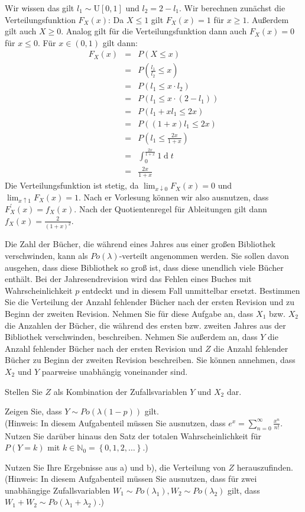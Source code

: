 \begin{Answer}
Wir wissen das gilt $l_1\sim \text{U}\left[0,1\right]$ und $l_2=2-l_1$. Wir berechnen zunächst die Verteilungsfunktion $F_X(x)$:
Da $X\leq 1$ gilt $F_X(x)=1$ für $x\geq1$. Außerdem gilt auch $X\geq 0$. Analog gilt für die Verteilungsfunktion dann auch $F_X(x)=0$ für $x\leq0$. Für $x\in\left(0,1\right)$ gilt dann:
\begin{eqnarray*}
	F_X(x)&=&P(X\leq x)\\
	&=&P(\frac{l_1}{l_2}\leq x)\\
	&=&P(l_1\leq x\cdot l_2)\\
	&=&P(l_1\leq x\cdot (2-l_1))\\
	&=&P(l_1+xl_1\leq 2x)\\
	&=&P((1+x)l_1\leq 2x)\\
	&=&P(l_1\leq \frac{2x}{1+x})\\
	&=&\int_0^{\frac{2x}{1+x}}1\operatorname{d}t\\
	&=&\frac{2x}{1+x}
\end{eqnarray*}
Die Verteilungsfunktion ist stetig, da $\lim_{x\downarrow0}F_X(x)=0$ und $\lim_{x\uparrow1}F_X(x)=1$. Nach er Vorlesung können wir also ausnutzen, dass $F^{'}_X(x)=f_X(x)$. Nach der Quotientenregel für Ableitungen gilt dann $f_X(x)=\frac{2}{(1+x)^2}$.
\end{Answer}


\begin{Exercise}
	Die Zahl der Bücher, die während eines Jahres aus einer großen Bibliothek verschwinden, kann als $Po(\lambda)$-verteilt angenommen werden. Sie sollen davon ausgehen, dass diese Bibliothek so groß ist, dass diese unendlich viele Bücher enthält. Bei der Jahresendrevision wird das Fehlen eines Buches mit Wahrscheinlichkeit $p$ entdeckt und in diesem Fall unmittelbar ersetzt. Bestimmen Sie die Verteilung der Anzahl fehlender Bücher nach der ersten Revision und zu Beginn der zweiten Revision. Nehmen Sie für diese Aufgabe an, dass $X_1$ bzw. $X_2$ die Anzahlen der Bücher, die während des ersten bzw. zweiten Jahres aus der Bibliothek verschwinden, beschreiben. Nehmen Sie außerdem an, dass $Y$ die Anzahl fehlender Bücher nach der ersten Revision und $Z$ die Anzahl fehlender Bücher zu Beginn der zweiten Revision beschreiben. Sie können annehmen, dass $X_2$ und $Y$ paarweise unabhängig voneinander sind.
	
	\Question Stellen Sie $Z$ als Kombination der Zufallsvariablen $Y$ und $X_2$ dar.
	
	\Question Zeigen Sie, dass $Y\sim Po(\lambda(1-p))$ gilt.\\
	(Hinweis: In diesem Aufgabenteil müssen Sie ausnutzen, dass $e^x=\sum_{n=0}^\infty \frac{x^n}{n!}$. Nutzen Sie darüber hinaus den Satz der totalen Wahrscheinlichkeit für $P(Y=k)$ mit $k\in\mathbb{N}_0=\left\lbrace0,1,2,\dots\right\rbrace$.)
	
	\Question Nutzen Sie Ihre Ergebnisse aus a) und b), die Verteilung von $Z$ herauszufinden.\\
	(Hinweis: In diesem Aufgabenteil müssen Sie ausnutzen, dass für zwei unabhängige Zufallsvariablen $W_1\sim Po(\lambda_1),W_2\sim Po(\lambda_2)$ gilt, dass $W_1+W_2\sim Po(\lambda_1+\lambda_2)$.)
\end{Exercise}

